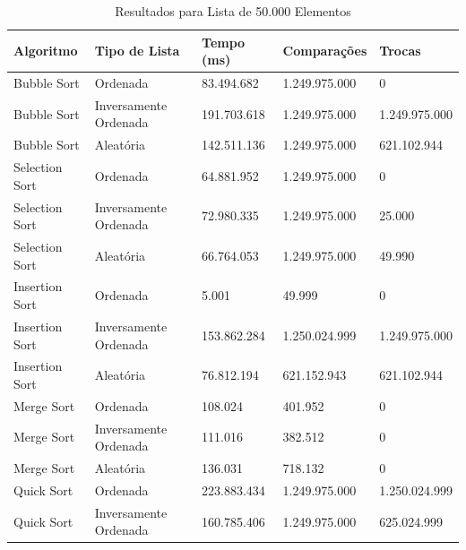 \documentclass[tcc2]{uftex}
\begin{document}
\begin{table}[h]
\centering
\caption{Resultados para Lista de 50.000 Elementos}
\begin{tabular}{|l|l|l|l|l|}
\hline
\textbf{Algoritmo}   & \textbf{Tipo de Lista}       & \textbf{Tempo (ms)} & \textbf{Comparações} & \textbf{Trocas} \\ \hline
Bubble Sort          & Ordenada                     & 83.494.682          & 1.249.975.000        & 0              \\ \hline
Bubble Sort          & Inversamente Ordenada        & 191.703.618         & 1.249.975.000        & 1.249.975.000  \\ \hline
Bubble Sort          & Aleatória                    & 142.511.136         & 1.249.975.000        & 621.102.944    \\ \hline
Selection Sort       & Ordenada                     & 64.881.952          & 1.249.975.000        & 0              \\ \hline
Selection Sort       & Inversamente Ordenada        & 72.980.335          & 1.249.975.000        & 25.000         \\ \hline
Selection Sort       & Aleatória                    & 66.764.053          & 1.249.975.000        & 49.990         \\ \hline
Insertion Sort       & Ordenada                     & 5.001               & 49.999               & 0              \\ \hline
Insertion Sort       & Inversamente Ordenada        & 153.862.284         & 1.250.024.999        & 1.249.975.000  \\ \hline
Insertion Sort       & Aleatória                    & 76.812.194          & 621.152.943          & 621.102.944    \\ \hline
Merge Sort           & Ordenada                     & 108.024             & 401.952              & 0              \\ \hline
Merge Sort           & Inversamente Ordenada        & 111.016             & 382.512              & 0              \\ \hline
Merge Sort           & Aleatória                    & 136.031             & 718.132              & 0              \\ \hline
Quick Sort           & Ordenada                     & 223.883.434         & 1.249.975.000        & 1.250.024.999  \\ \hline
Quick Sort           & Inversamente Ordenada        & 160.785.406         & 1.249.975.000        & 625.024.999    \\ \hline

\end{tabular}
\end{table}
\end{document}
